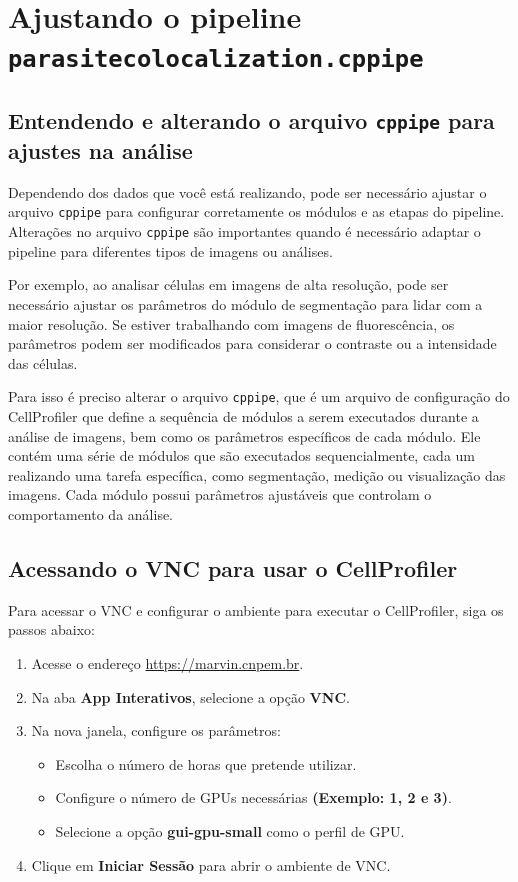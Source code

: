 \documentclass{article}
\begin{document}
\section{Ajustando o pipeline \texttt{parasitecolocalization.cppipe}}

\subsection{Entendendo e alterando o arquivo \texttt{cppipe} para ajustes na análise}
Dependendo dos dados que você está realizando, pode ser necessário ajustar o arquivo \texttt{cppipe} para configurar corretamente os módulos e as etapas do pipeline. Alterações no arquivo \texttt{cppipe} são importantes quando é necessário adaptar o pipeline para diferentes tipos de imagens ou análises.

Por exemplo, ao analisar células em imagens de alta resolução, pode ser necessário ajustar os parâmetros do módulo de segmentação para lidar com a maior resolução. Se estiver trabalhando com imagens de fluorescência, os parâmetros podem ser modificados para considerar o contraste ou a intensidade das células.

Para isso é preciso alterar o arquivo \texttt{cppipe}, que é um arquivo de configuração do CellProfiler que define a sequência de módulos a serem executados durante a análise de imagens, bem como os parâmetros específicos de cada módulo. Ele contém uma série de módulos que são executados sequencialmente, cada um realizando uma tarefa específica, como segmentação, medição ou visualização das imagens. Cada módulo possui parâmetros ajustáveis que controlam o comportamento da análise.



\subsection{Acessando o VNC para usar o CellProfiler}  

Para acessar o VNC e configurar o ambiente para executar o CellProfiler, siga os passos abaixo:  

\begin{enumerate}  
  \item Acesse o endereço \href{https://marvin.cnpem.br}{https://marvin.cnpem.br}.  
  \item Na aba \textbf{App Interativos}, selecione a opção \textbf{VNC}.  
  \item Na nova janela, configure os parâmetros:  
  \begin{itemize}  
    \item Escolha o número de horas que pretende utilizar.  
    \item Configure o número de GPUs necessárias \textbf{(Exemplo: 1, 2 e 3)}.  
    \item Selecione a opção \textbf{gui-gpu-small} como o perfil de GPU.  
  \end{itemize}  
  \item Clique em \textbf{Iniciar Sessão} para abrir o ambiente de VNC.  
\end{enumerate}  
\end{document}
